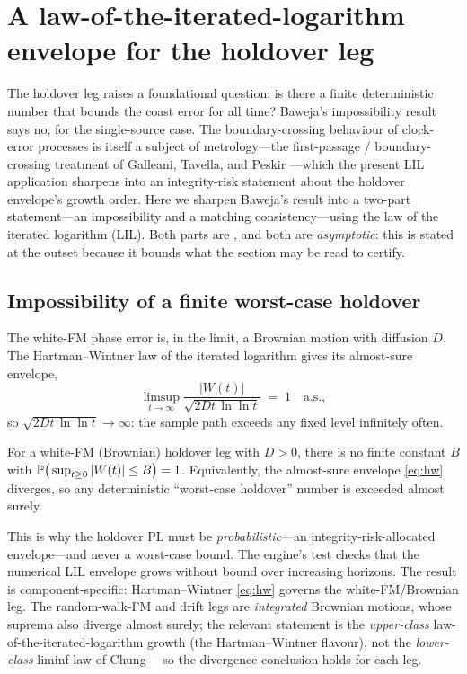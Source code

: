 \section{A law-of-the-iterated-logarithm envelope for the holdover leg}
\label{sec:lil}

The holdover leg raises a foundational question: is there a finite deterministic
number that bounds the coast error for all time? Baweja's impossibility result
\citep{baweja2026tpl} says no, for the single-source case. The boundary-crossing
behaviour of clock-error processes is itself a subject of metrology---the
first-passage / boundary-crossing treatment of Galleani, Tavella, and Peskir
\citep{galleani2016}---which the present LIL application sharpens into an
integrity-risk statement about the holdover envelope's growth order. Here we sharpen
Baweja's result into a two-part statement---an impossibility and a matching
consistency---using the law of the iterated logarithm (LIL). Both parts are \Proven{}, and both are
\emph{asymptotic}: this is stated at the outset because it bounds what the section
may be read to certify.

\subsection{Impossibility of a finite worst-case holdover}
\label{sec:impossible}

The white-FM phase error is, in the limit, a Brownian motion with diffusion $D$.
The Hartman--Wintner law of the iterated logarithm \citep{hartman1941} gives its
almost-sure envelope,
\begin{equation}
  \limsup_{t\to\infty}\frac{|W(t)|}{\sqrt{2Dt\,\ln\ln t}} \;=\; 1
  \quad\text{a.s.},
  \label{eq:hw}
\end{equation}
so $\sqrt{2Dt\,\ln\ln t}\to\infty$: the sample path exceeds any fixed level
infinitely often.

\begin{proposition}
\label{prop:impossible}
For a white-FM (Brownian) holdover leg with $D>0$, there is no finite constant $B$
with $\mathbb{P}\big(\sup_{t\ge0}|W(t)|\le B\big)=1$. Equivalently, the almost-sure
envelope \eqref{eq:hw} diverges, so any deterministic ``worst-case holdover''
number is exceeded almost surely.
\end{proposition}

This is why the holdover PL must be \emph{probabilistic}---an integrity-risk-allocated
envelope---and never a worst-case bound. The engine's test
 checks that the numerical LIL
envelope grows without bound over increasing horizons. The result is
component-specific: Hartman--Wintner \eqref{eq:hw} governs the white-FM/Brownian
leg. The random-walk-FM and drift legs are \emph{integrated} Brownian motions, whose
suprema also diverge almost surely; the relevant statement is the \emph{upper-class}
law-of-the-iterated-logarithm growth (the Hartman--Wintner \citep{hartman1941}
flavour), not the \emph{lower-class} liminf law of Chung \citep{chung1948}---so the
divergence conclusion holds for each leg.

